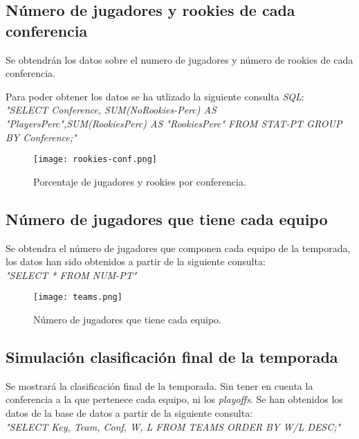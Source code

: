 \documentclass[11pt]{diazessay} %
\begin{document}
\subsection{Número de jugadores y rookies de cada conferencia}
Se obtendrán los datos sobre el numero de jugadores y número de rookies de cada conferencia. 

Para poder obtener los datos se ha utlizado la siguiente consulta \textit{SQL}:\\

\textit{"SELECT Conference, SUM(NoRookies-Perc) AS "PlayersPerc",SUM(RookiesPerc) AS "RookiesPerc" FROM STAT-PT GROUP BY Conference;"}

\begin{figure}[!h]
	\centering
	\texttt{[image: rookies-conf.png]}
	\caption{Porcentaje de jugadores y rookies por conferencia.}
	\label{fig:rookies-conf}
\end{figure}

\subsection{Número de jugadores que tiene cada equipo}
Se obtendra el número de jugadores que componen cada equipo de la temporada, los datos han sido obtenidos a partir de la siguiente consulta:\\

\textit{"SELECT * FROM NUM-PT"}

\begin{figure}[!h]
	\centering
	\texttt{[image: teams.png]}
	\caption{Número de jugadores que tiene cada equipo.}
	\label{fig:teams}
\end{figure}

\subsection{Simulación clasificación final de la temporada}
Se mostrará la clasificación final de la temporada. Sin tener en cuenta la conferencia a la que pertenece cada equipo, ni los \textit{playoffs}. 
Se han obtenidos los datos de la base de datos a partir de la siguiente consulta:\\

\textit{"SELECT Key, Team, Conf, W, L FROM TEAMS ORDER BY W/L DESC;"}
\end{document}
